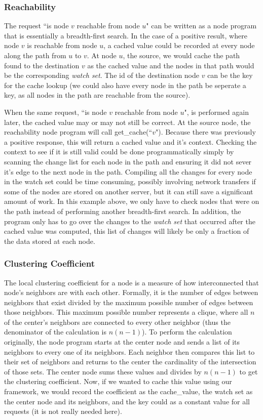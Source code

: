 \documentclass[letterpaper,twocolumn,11pt,tight]{article}
\begin{document}
\subsubsection{Reachability}
The request ``is node $v$ reachable from node $u$" can be written as a node program that is essentially a breadth-first search. In the case of a positive result, where node $v$ is reachable from node $u$, a cached value could be recorded at every node along the path from $u$ to $v$. At node $u$, the source, we would cache the path found to the destination $v$ as the cached value and the nodes in that path would be the corresponding \emph{watch set}. The id of the destination node $v$ can be the key for the cache lookup (we could also have every node in the path be seperate a key, as all nodes in the path are reachable from the source). 

    When the same request, ``is node $v$ reachable from node $u$", is performed again later, the cached value may or may not still be correct. At the source node, the reachability node program will call get\_cache(``$v$"). Because there was previously a positive response, this will return a cached value and it's context. Checking the context to see if it is still valid could be done programmatically simply by scanning the change list for each node in the path and ensuring it did not sever it's edge to the next node in the path.
    Compiling all the changes for every node in the watch set could be time consuming, possibly involving network transfers if some of the nodes are stored on another server, but it can still save a significant amount of work. In this example above, we only have to check nodes that were on the path instead of performing another breadth-first search. In addition, the program only has to go over the changes to the \emph{watch set} that occurred after the cached value was computed, this list of changes will likely be only a fraction of the data stored at each node.
\subsubsection{Clustering Coefficient}
The local clustering coefficient for a node is a measure of how interconnected that node's neighbors are with each other. Formally, it is the number of edges between neighbors that exist divided by the maximum possible number of edges between those neighbors. This maximum possible number represents a clique, where all $n$ of the center's neighbors are connected to every other neighbor (thus the denominator of the calculation is $n(n-1)$). To perform the calculation originally, the node program starts at the center node and sends a list of its neighbors to every one of its neighbors. Each neighbor then compares this list to their set of neighbors and returns to the center the cardinality of the intersection of those sets. The center node sums these values and divides by $n(n-1)$ to get the clustering coefficient. Now, if we wanted to cache this value using our framework, we would record the coefficient as the cache\_value, the watch set as the center node and its neighbors, and the key could as a constant value for all requests (it is not really needed here).
\end{document}

